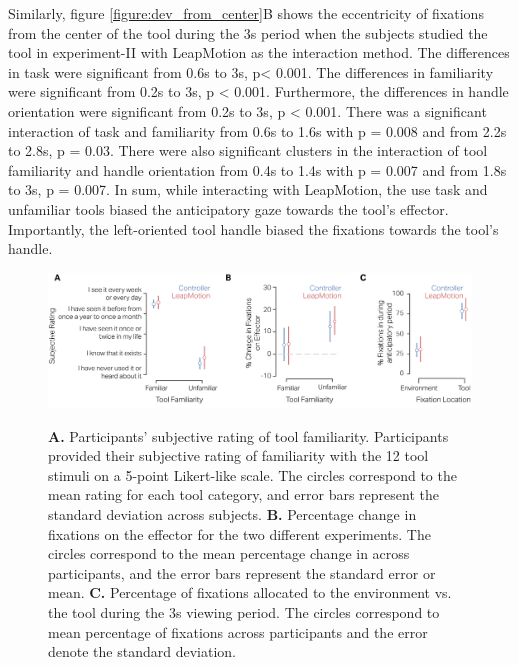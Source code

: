 Similarly, figure \ref{figure:dev_from_center}B shows the eccentricity of fixations from the center of the tool during the 3s period when the subjects studied the tool in experiment-II with LeapMotion as the interaction method. The differences in task were significant from 0.6s to 3s, p< 0.001. The differences in familiarity were significant from 0.2s to 3s, p < 0.001. Furthermore, the differences in handle orientation were significant from 0.2s to 3s, p < 0.001. There was a significant interaction of task and familiarity from 0.6s to 1.6s with p = 0.008 and from 2.2s to 2.8s, p = 0.03. There were also significant clusters in the interaction of tool familiarity and handle orientation from 0.4s to 1.4s with p = 0.007 and from 1.8s to 3s, p = 0.007. In sum, while interacting with LeapMotion, the use task and unfamiliar tools biased the anticipatory gaze towards the tool's effector. Importantly, the left-oriented tool handle biased the fixations towards the tool's handle.


\begin{figure}[t]
    \centering
    \includegraphics[width=1\linewidth]{source/figures/result/extra_analysis.png} \\
    \caption[]{ \textbf{A.}  Participants’ subjective rating of tool familiarity. Participants provided their subjective rating of familiarity with the 12 tool stimuli on a 5-point Likert-like scale. The circles correspond to the mean rating for each tool category, and error bars represent the standard deviation across subjects. \textbf{B.} Percentage change in fixations on the effector for the two different experiments. The circles correspond to the mean percentage change in across participants, and the error bars represent the standard error or mean. \textbf{C.} Percentage of fixations allocated to the environment vs. the tool during the 3s viewing period. The circles correspond to mean percentage of fixations across participants and the error denote the standard deviation.}
    \label{figure:familiarity_rating}
\end{figure}


